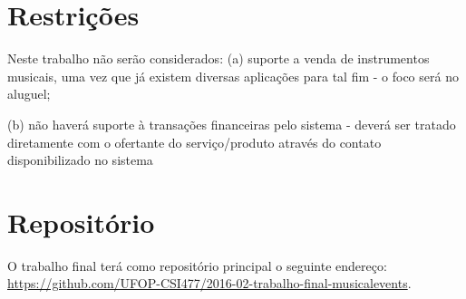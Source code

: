\documentclass[10pt,a4paper,article]{abntex2}
\begin{document}
	\section{Restrições}

		Neste trabalho não serão considerados: 
		(a) suporte a venda de instrumentos musicais, uma vez que já existem diversas aplicações para tal fim - o foco será no aluguel;

		(b) não haverá suporte à transações financeiras pelo sistema - deverá ser tratado diretamente com o ofertante do serviço/produto através do contato disponibilizado no sistema

	\section{Repositório}

		O trabalho final terá como repositório principal o seguinte endereço: \url{https://github.com/UFOP-CSI477/2016-02-trabalho-final-musicalevents}.

\end{document}
